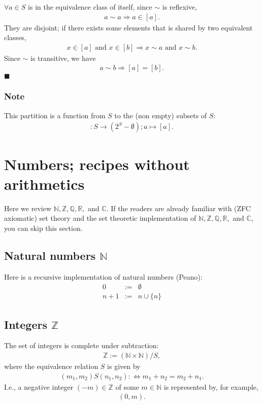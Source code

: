 \documentclass[11pt]{book}
\begin{document}
$\forall a \in S$ is in the equivalence class of itself, since $\sim$ is reflexive,
\begin{eqnarray}
a \sim a \Rightarrow a \in [a].
\end{eqnarray}
They are disjoint; if there exists some elements that is shared by two equivalent classes,
\begin{eqnarray}
x \in [a] \text{ and } x \in [b] \Rightarrow x \sim a \text{ and } x \sim b.
\end{eqnarray}
Since $\sim$ is transitive, we have
\begin{eqnarray}
a \sim b \Rightarrow [a] = [b].
\end{eqnarray}
$\blacksquare$

\subsubsection{Note}
This partition is a function from $S$ to the (non empty) subsets of $S$:
\begin{eqnarray}
[] : S \to (2^S - \emptyset); a \mapsto [a].
\end{eqnarray}


\section{Numbers; recipes without arithmetics}
Here we review $\mathbb{N, Z, Q, R},$ and $\mathbb{C}$.
If the readers are already familiar with (ZFC axiomatic) set theory and the set theoretic implementation of $\mathbb{N, Z, Q, R},$ and $\mathbb{C}$, you can skip this section.

\subsection{Natural numbers $\mathbb{N}$}
Here is a recursive implementation of natural numbers (Peano):
\begin{eqnarray}
0 &:=& \emptyset \\
n+1 &:=& n \cup \{n\}
\end{eqnarray}

\subsection{Integers $\mathbb{Z}$}
The set of integers is complete under subtraction:
\begin{eqnarray*}
\mathbb{Z} := (\mathbb{N} \times \mathbb{N})/ S,
\end{eqnarray*}
where the equivalence relation $S$ is given by
\begin{eqnarray}
(m_1, m_2)S(n_1,n_2) :\Leftrightarrow m_1 + n_2 = m_2 + n_1.
\end{eqnarray}
I.e., a negative integer $(-m) \in \mathbb{Z}$ of some $m \in \mathbb{N}$ is represented by, for example,
\begin{eqnarray}
(0,m).
\end{eqnarray}
\end{document}
